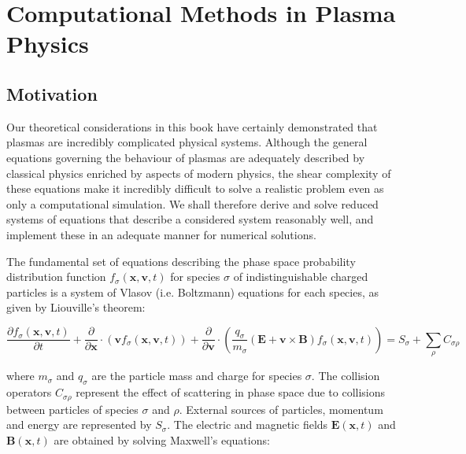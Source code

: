 
\chapter{Computational Methods in Plasma Physics}

\section{Motivation}

Our theoretical considerations in this book have certainly demonstrated that plasmas are incredibly complicated physical systems. Although the general equations governing the behaviour of plasmas are adequately described by classical physics enriched by aspects of modern physics, the shear complexity of these equations make it incredibly difficult to solve a realistic problem even as only a computational simulation. We shall therefore derive and solve reduced systems of equations that describe a considered system reasonably well, and implement these in an adequate manner for numerical solutions.

\vspace*{2.5pt}

\quad The fundamental set of equations describing the phase space probability distribution function $f_\sigma(\mathbf{x},\mathbf{v},t)$ for species $\sigma$ of indistinguishable charged particles is a system of Vlasov (i.e. Boltzmann) equations for each species, as given by Liouville's theorem:

\begin{equation}
    \label{comp-1}
    \frac{\partial f_\sigma(\mathbf{x},\mathbf{v},t)}{\partial t}+\frac{\partial}{\partial \mathbf{x}}\cdot \left(\mathbf{v}f_\sigma(\mathbf{x},\mathbf{v},t)\right)+\frac{\partial}{\partial \mathbf{v}}\cdot \left(\frac{q_\sigma}{m_\sigma}\left(\mathbf{E}+\mathbf{v}\times \mathbf{B}\right)f_\sigma(\mathbf{x},\mathbf{v},t)\right)=S_\sigma+\sum_{\rho}C_{\sigma\rho}
\end{equation}

where $m_\sigma$ and $q_\sigma$ are the particle mass and charge for species $\sigma$. The collision operators $C_{\sigma\rho}$ represent the effect of scattering in phase space due to collisions between particles of species $\sigma$ and $\rho$. External sources of particles, momentum and energy are represented by $S_\sigma$. The electric and magnetic fields $\mathbf{E}(\mathbf{x},t)$ and $\mathbf{B}(\mathbf{x},t)$ are obtained by solving Maxwell's equations:

